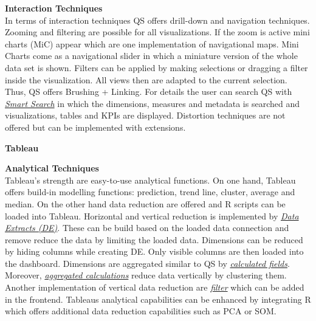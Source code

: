\textbf{Interaction Techniques}\\
In terms of interaction techniques QS offers drill-down and navigation techniques. Zooming and filtering are possible for all visualizations. If the zoom is active mini charts (MiC) appear which are one implementation of navigational maps\cite{beard1990navigational}. Mini Charts come as a navigational slider in which a miniature version of the whole data set\cite{beard1990navigational} is shown. 
Filters can be applied by making selections or dragging a filter inside the visualization\cite{qlikSheet}. All views then are adapted to the current selection. Thus, QS offers Brushing + Linking. For details the user can search QS with \href{https://help.qlik.com/en-US/sense/2.1/Content/Videos/Videos-global-smart-search.htm}{\textit{Smart Search}} in which the dimensions, measures and metadata is searched and visualizations, tables and KPIs are displayed\cite{qlikSmart}. Distortion techniques are not offered but can be implemented with extensions. 
\par
\noindent \textbf{Tableau}
\par
\textbf{Analytical Techniques}\\
Tableau's strength are easy-to-use analytical functions. On one hand, Tableau offers build-in modelling functions: prediction, trend line, cluster, average and median. On the other hand data reduction are offered and R scripts can be loaded into Tableau. Horizontal and vertical reduction is implemented by \href{http://onlinehelp.tableau.com/current/pro/desktop/en-us/extracting_data.html}{\textit{Data Extracts (DE)}}. These can be build based on the loaded data connection and remove reduce the data by limiting the loaded data. Dimensions can be reduced by hiding columns while creating DE. Only visible columns are then loaded into the dashboard. Dimensions are aggregated similar to QS by \href{http://onlinehelp.tableau.com/current/pro/desktop/en-us/calculations_calculatedfields.html}{\textit{calculated fields}}. Moreover,  \href{http://onlinehelp.tableau.com/current/pro/desktop/en-us/calculations_calculatedfields_aggregate.html}{\textit{aggregated calculations}} reduce data vertically by clustering them. Another implementation of vertical data reduction are  \href{http://kb.tableau.com/articles/howto/adding-filters-to-dashboards}{\textit{filter}} which can be added in the frontend. Tableaus analytical capabilities can be enhanced by integrating R which offers additional data reduction capabilities such as PCA or SOM.
\par
